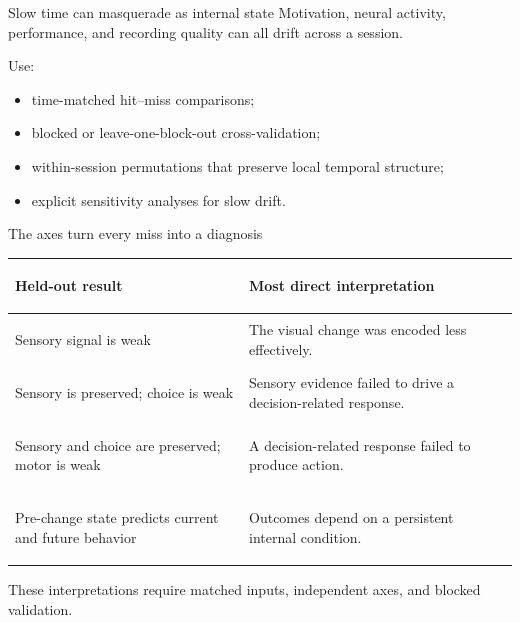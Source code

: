 \documentclass[aspectratio=169,10pt]{beamer}
\begin{document}
\begin{frame}{Slow time can masquerade as internal state}
  Motivation, neural activity, performance, and recording quality can all drift
  across a session.

  \vspace{.6em}
  Use:
  \begin{itemize}
    \item time-matched hit--miss comparisons;
    \item blocked or leave-one-block-out cross-validation;
    \item within-session permutations that preserve local temporal structure;
    \item explicit sensitivity analyses for slow drift.
  \end{itemize}

\end{frame}

\begin{frame}{The axes turn every miss into a diagnosis}
  \renewcommand{\arraystretch}{1.25}
  \begin{tabularx}{\textwidth}{>{\bfseries\raggedright\arraybackslash}p{}Y}
    \toprule
    Held-out result & Most direct interpretation \\
    \midrule
    Sensory signal is weak & The visual change was encoded less effectively. \\
    Sensory is preserved; choice is weak & Sensory evidence failed to drive a decision-related response. \\
    Sensory and choice are preserved; motor is weak & A decision-related response failed to produce action. \\
    Pre-change state predicts current and future behavior & Outcomes depend on a persistent internal condition. \\
    \bottomrule
  \end{tabularx}

  \vspace{.6em}
  These interpretations require matched inputs, independent axes, and blocked
  validation.
\end{frame}
\end{document}
